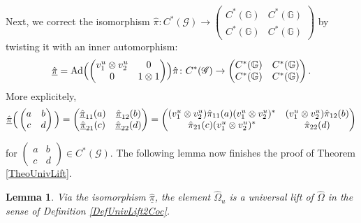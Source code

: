 \documentclass[reqno]{amsart}
\numberwithin{equation}{section}
\newtheorem{Lem}[Theorem]{Lemma}
\newcommand{\G}{\mathbb{G}}
\newcommand{\msG}{\mathscr{G}}
\newcommand{\oon}{\operatorname}
\begin{document}
Next, we correct the isomorphism $\hat{\pi}\colon C^*(\msG)\rightarrow \begin{pmatrix}
C^*(\G) & C^*(\G) \\ C^*(\G) & C^*(\G)
\end{pmatrix}$ by twisting it with an inner automorphism:
\begin{equation}\label{eq33}
\underline{\hat{\pi}}=\oon{Ad}\Bigl( \begin{pmatrix}
v_1^{u } \otimes v_2^{u } & 0 \\ 0 & 1\otimes 1
\end{pmatrix}\Bigr) \hat{\pi}\colon
C^*(\msG)\rightarrow \begin{pmatrix}
C^*(\G) & C^*(\G) \\ C^*(\G) & C^*(\G)
\end{pmatrix}.
\end{equation}
More explicitely,
\begin{equation}\label{eq34}
\underline{\hat{\pi}}
\Bigl(\,\begin{pmatrix}
a & b \\ c & d
\end{pmatrix}\,\Bigr)=
\begin{pmatrix}
\underline{\hat{\pi}}_{11}(a) & 
\underline{\hat{\pi}}_{12}(b)\\
\underline{\hat{\pi}}_{21}(c) & 
\underline{\hat{\pi}}_{22}(d)
\end{pmatrix}=
\begin{pmatrix}
(v^{u }_1\otimes v_2^{u })\hat{\pi}_{11}(a)
(v_1^u\otimes v_2^u)^* & 
(v^u_1\otimes v_2^u)\hat{\pi}_{12}(b)\\
\hat{\pi}_{21}(c)(v_1^u\otimes v_2^u)^* & 
\hat{\pi}_{22}(d)
\end{pmatrix}
\end{equation}

for $\begin{pmatrix}
a & b \\ c &d
\end{pmatrix}\in C^*(\msG)$. The following lemma now finishes the proof of Theorem \ref{TheoUnivLift}.

\begin{Lem}\label{lemma8}
Via the isomorphism $\underline{\hat{\pi}}$, the element $\hat{\Omega}_u$ is a universal lift of $\hat{\Omega}$ in the sense of Definition \ref{DefUnivLift2Coc}.
\end{Lem}
\end{document}

